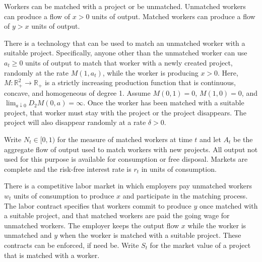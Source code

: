 \documentclass[11pt,english]{article}
\begin{document}
Workers can be matched with a project or be unmatched. Unmatched workers can
produce a flow of $x > 0$ units of output. Matched workers can produce a flow
of $y > x$ units of output.
 
There is a technology that can be used to match an unmatched worker with a
suitable project. Specifically, anyone other than the unmatched worker can use
$a_t \geq 0$ units of output to match that worker with a newly created
project, randomly at the rate $M(1, a_t)$, while the worker is producing $x >
0$. Here, $M : \mathbb{R}_+^2 \to \mathbb{R}_+$ is a strictly increasing
production function that is continuous, concave, and homogeneous of degree 1.
Assume $M(0,1) = 0$, $M(1,0) = 0$, and $\lim_{a\downarrow 0} D_2 M(0, a) =
\infty$. Once the worker has been matched with a suitable project, that worker
must stay with the project or the project disappears. The project will also
disappear randomly at a rate $\delta > 0$.
 
Write $N_t \in [0,1)$ for the measure of matched workers at time $t$ and let
$A_t$ be the aggregate flow of output used to match workers with new projects.
All output not used for this purpose is available for consumption or free
disposal. Markets are complete and the risk-free interest rate is $r_t$ in
units of consumption.
 
There is a competitive labor market in which employers pay unmatched workers
$w_t$ units of consumption to produce $x$ and participate in the matching
process. The labor contract specifies that workers commit to produce $y$ once
matched with a suitable project, and that matched workers are paid the going
wage for unmatched workers. The employer keeps the output flow $x$ while the
worker is unmatched and $y$ when the worker is matched with a suitable project.
These contracts can be enforced, if need be. Write $S_t$ for the market value
of a project that is matched with a worker.
 
\end{document}

